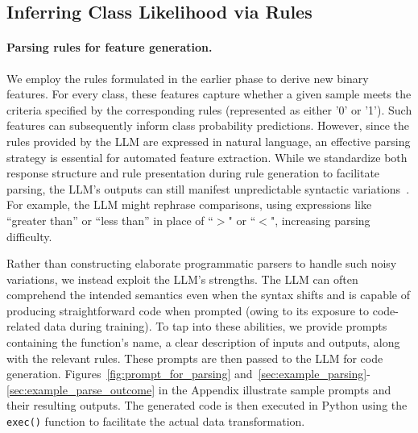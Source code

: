 \subsection{Inferring Class Likelihood via Rules}
\label{Sec:training}

\paragraph{Parsing rules for feature generation.} We employ the rules formulated in the earlier phase to derive new binary features. For every class, these features capture whether a given sample meets the criteria specified by the corresponding rules (represented as either '0' or '1'). Such features can subsequently inform class probability predictions. However, since the rules provided by the LLM are expressed in natural language, an effective parsing strategy is essential for automated feature extraction. While we standardize both response structure and rule presentation during rule generation to facilitate parsing, the LLM's outputs can still manifest unpredictable syntactic variations~\cite{kovavc2023large}. For example, the LLM might rephrase comparisons, using expressions like ``greater than'' or ``less than'' in place of ``$>$" or ``$<$", increasing parsing difficulty.

Rather than constructing elaborate programmatic parsers to handle such noisy variations, we instead exploit the LLM’s strengths. The LLM can often comprehend the intended semantics even when the syntax shifts and is capable of producing straightforward code when prompted (owing to its exposure to code-related data during training). To tap into these abilities, we provide prompts containing the function’s name, a clear description of inputs and outputs, along with the relevant rules. These prompts are then passed to the LLM for code generation. Figures~\ref{fig:prompt_for_parsing} and~\ref{sec:example_parsing}-\ref{sec:example_parse_outcome} in the Appendix illustrate sample prompts and their resulting outputs. The generated code is then executed in Python using the \texttt{exec()} function to facilitate the actual data transformation.

\vspace*{-0.12in}
